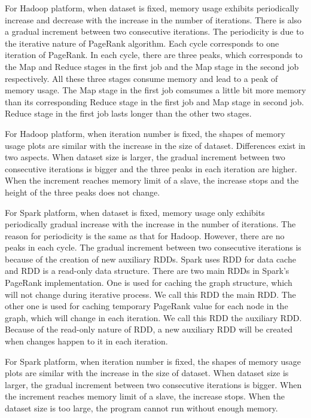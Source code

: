 \documentclass[12pt,conference,letterpaper]{IEEEtran}
\begin{document}
For Hadoop platform, when dataset is fixed, memory usage exhibits periodically increase and decrease with the increase in the number of iterations. There is also a gradual increment between two consecutive iterations. The periodicity is due to the iterative nature of PageRank algorithm. Each cycle corresponds to one iteration of PageRank. In each cycle, there are three peaks, which corresponds to the Map and Reduce stages in the first job and the Map stage in the second job respectively. All these three stages consume memory and lead to a peak of memory usage. The Map stage in the first job comsumes a little bit more memory than its corresponding Reduce stage in the first job and Map stage in second job. Reduce stage in the first job lasts longer than the other two stages. 

For Hadoop platform, when iteration number is fixed, the shapes of memory usage plots are similar with the increase in the size of dataset. Differences exist in two aspects. When dataset size is larger, the gradual increment between two consecutive iterations is bigger and the three peaks in each iteration are higher. When the increment reaches memory limit of a slave, the increase stops and the height of the three peaks does not change.

For Spark platform, when dataset is fixed, memory usage only exhibits periodically gradual increase with the increase in the number of iterations. The reason for periodicity is the same as that for Hadoop. However, there are no peaks in each cycle. The gradual increment between two consecutive iterations is because of the creation of new auxiliary RDDs. Spark uses RDD for data cache and RDD is a read-only data structure. There are two main RDDs in Spark's PageRank implementation. One is used for caching the graph structure, which will not change during iterative process. We call this RDD the main RDD. The other one is used for caching temporary PageRank value for each node in the graph, which will change in each iteration. We call this RDD the auxiliary RDD. Because of the read-only nature of RDD, a new auxiliary RDD will be created when changes happen to it in each iteration.

For Spark platform, when iteration number is fixed, the shapes of memory usage plots are similar with the increase in the size of dataset. When dataset size is larger, the gradual increment between two consecutive iterations is bigger. When the increment reaches memory limit of a slave, the increase stops. When the dataset size is too large, the program cannot run without enough memory.
\end{document}
